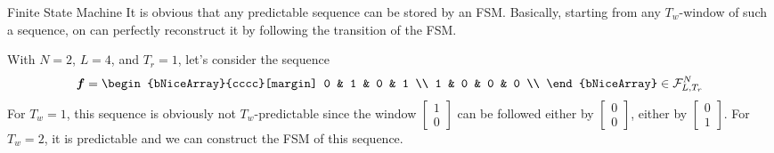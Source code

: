 \documentclass{beamer}
\begin{document}
	\begin{frame}{Finite State Machine}
		\justifying
		It is obvious that any predictable sequence can be stored by an FSM. Basically, starting from any $T_w$-window of such a sequence, on can perfectly reconstruct it by following the transition of the FSM. 

		\begin{example}
			\justifying
			With $N=2$, $L=4$, and $T_r=1$, let's consider the sequence
			\begin{equation*}
				\mat{f} = 
				\begin{bNiceArray}{cccc}[margin] 
					0 & 1 & 0 & 1 \\ 
					1 & 0 & 0 & 0 \\ 
				\end{bNiceArray} \in \set{F}_{L, T_r}^N
			\end{equation*}
			For $T_w = 1$, this sequence is obviously not $T_w$-predictable since the window $\begin{bmatrix} 1 \\ 0 \end{bmatrix}$ can be followed either by $\begin{bmatrix} 0 \\ 0 \end{bmatrix}$, either by $\begin{bmatrix} 0 \\ 1 \end{bmatrix}$. For $T_w = 2$, it is predictable and we can construct the FSM of this sequence.
		\end{example}
	\end{frame}
\end{document}

